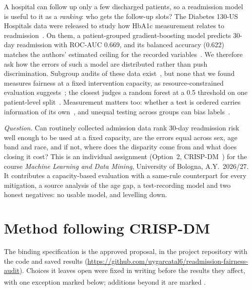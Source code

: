 \documentclass[conference]{IEEEtran}
\newcommand{\add}{\textsuperscript{\dag}}  %
\begin{document}
A hospital can follow up only a few discharged patients, so a readmission model is useful to it
as a \emph{ranking}: who gets the follow-up slots? The Diabetes 130-US Hospitals data were
released to study how HbA1c measurement relates to readmission~\cite{strack2014}. On them, a
patient-grouped gradient-boosting model predicts 30-day readmission with ROC-AUC 0.669, and its
balanced accuracy (0.622) matches the authors' estimated ceiling for the recorded
variables~\cite{chowdhury2026}. %
We therefore ask how the errors of such a model are distributed rather than push discrimination. Subgroup audits of these data exist~\cite{mateedulsatit2026,alzanbouri2024,abdelhay2026},
but none that we found measures fairness at a fixed intervention capacity, as resource-constrained
evaluation suggests~\cite{singh2023}; the closest judges a random forest at a 0.5 threshold on one
patient-level split~\cite{mateedulsatit2026}.
Measurement matters too: whether a test is ordered carries information
of its own~\cite{agniel2018}, and unequal testing across groups can bias labels~\cite{chang2022}.

\emph{Question.} Can routinely collected admission data rank 30-day readmission risk well enough
to be used at a fixed capacity, are the errors equal across sex, age band and race, and if not,
where does the disparity come from and what does closing it cost? This is an individual assignment
(Option~2, CRISP-DM~\cite{shearer2000}) for the course \emph{Machine Learning and Data Mining},
University of Bologna, A.Y.~2026/27. It contributes a capacity-based
evaluation with a same-rule counterpart for every mitigation, a source analysis of the age gap, a
test-recording model and two honest negatives: no usable model, and levelling down.

\section{Method following CRISP-DM}

The binding specification is the approved proposal, in the project repository with the code and
saved results (\url{https://github.com/uygarcatal6/readmission-fairness-audit}).
Choices it leaves open were fixed in writing before the results they affect, with one exception
marked below; additions beyond it are marked \add.
\end{document}
